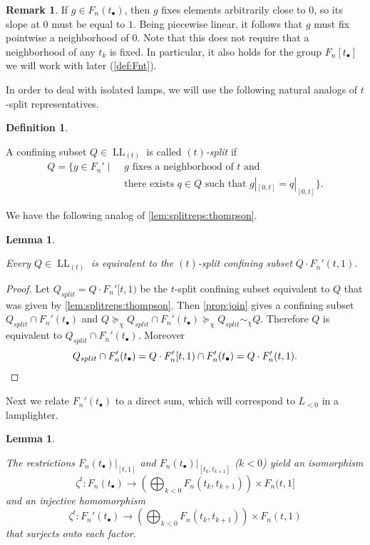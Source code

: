 \documentclass[reqno,12pt]{amsart}\setcounter{tocdepth}{1}
\newtheorem{lemma}[theorem]{Lemma}
\theoremstyle{definition}
\newtheorem{definition}[theorem]{Definition}
\newtheorem{remark}[theorem]{Remark}
\DeclareMathOperator{\LL}{LL}
\numberwithin{equation}{section}
\begin{document}
\begin{remark}
\label{rem:fixzero}
    If $g \in F_n(t_\bullet)$, then $g$ fixes elements arbitrarily close to $0$, so its slope at $0$ must be equal to $1$. Being piecewise linear, it follows that $g$ must fix pointwise a neighborhood of $0$. Note that this does not require that a neighborhood of any $t_k$ is fixed. In particular, it also holds for the group $F_n[t_\bullet]$ we will work with later (\cref{def:Fnt}).
\end{remark}

In order to deal with isolated lamps, we will use the following natural analogs of $t$-split representatives.


\begin{definition}
\label{def:splitreps:isolated}

A confining subset $Q \in \LL_{(t)}$ is called \emph{$(t)$-split} if
\begin{align*}
Q = \{ g \in F_n' \mid & \,\, g \text{ fixes a neighborhood of } t \text{ and}\\
& \,\, \text{there exists } q \in Q \text{ such that } g|_{[0, t]} = q|_{[0, t]} \}.
\end{align*}
\end{definition}

We have the following analog of \cref{lem:splitreps:thompson}.

\begin{lemma}
\label{lem:splitreps:isolated}

Every $Q \in \LL_{(t)}$ is equivalent to the $(t)$-split confining subset $Q\cdot F_n'(t, 1)$.
\end{lemma}

\begin{proof}
Let $Q_{split}=Q\cdot F_n'[t,1)$ be the $t$-split confining subset equivalent to $Q$ that was given by \cref{lem:splitreps:thompson}. Then \cref{prop:join} gives a confining subset $Q_{split} \cap F_n'(t_\bullet)$ and $Q \succeq_\chi Q_{split} \cap F_n'(t_\bullet) \succeq_\chi Q_{split} \sim_\chi Q$. Therefore $Q$ is equivalent to $Q_{split} \cap F_n'(t_\bullet)$. Moreover
\[Q_{split} \cap F_n'(t_\bullet) = Q \cdot F_n'[t, 1) \cap F_n'(t_\bullet) = Q \cdot F_n'(t, 1). \qedhere\]
\end{proof}

Next we relate $F_n'(t_\bullet)$ to a direct sum, which will correspond to $L_{< 0}$ in a lamplighter.

\begin{lemma}
\label{lem:Fnt:isolated:iso}

The restrictions $F_n(t_\bullet)|_{[t, 1]}$ and $F_n(t_\bullet)|_{[t_{k}, t_{k+1}]}$ ($k<0$) yield an isomorphism
\[\zeta^t \colon F_n(t_\bullet) \to \left( \bigoplus_{k < 0} F_n(t_{k}, t_{k+1}) \right) \times F_n(t, 1]\]
and an injective homomorphism
\[\zeta^t \colon F_n'(t_\bullet) \to \left( \bigoplus_{k < 0} F_n(t_{k}, t_{k+1}) \right) \times F_n(t, 1)\]
that surjects onto each factor.
\end{lemma}
\end{document}

